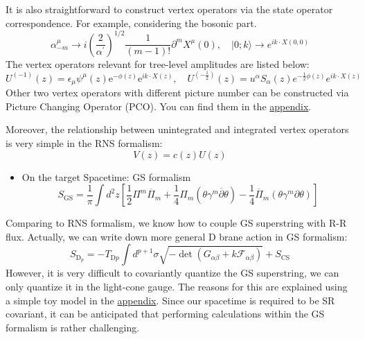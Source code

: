 \documentclass{beamer}
\begin{document}
	\begin{frame}
		It is also straightforward to construct vertex operators via the state operator correspondence. For example, considering the bosonic part.
		\begin{equation*}
			\alpha_{-m}^\mu\to i\left(\frac{2}{\alpha^{\prime}}\right)^{1/2}\frac{1}{(m-1)!}\partial^mX^\mu(0),\quad|0;k\rangle\to e^{ik\cdot X(0,0)}
		\end{equation*}
		The vertex operators relevant for tree-level amplitudes are listed below:
		\begin{equation*}
			U^{(-1)}(z)=\epsilon_\mu\psi^\mu(z)\mathrm{e}^{-\phi(z)}\mathrm{e}^{ik\cdot X(z)},\quad U^{(-\frac{1}{2})}(z)=u^\alpha S_\alpha(z)e^{-\frac{1}{2}\phi(z)}e^{ik\cdot X(z)}
		\end{equation*}
		Other two vertex operators with different picture number can be constructed via {\color{WHU}Picture Changing Operator (PCO)}. You can find them in the \hyperlink{vertex ops}{\color{blue} appendix}.
		
		Moreover, the relationship between unintegrated and integrated vertex operators is very simple in the RNS formalism:
		\begin{equation}\label{eq:UV}
			V(z) = c(z) U(z)
		\end{equation}
	\end{frame}
	\begin{frame}
		\begin{itemize}
		\item {\color{WHU} On the target Spacetime: GS formalism}
		\begin{equation*}
			S_{\mathrm{GS}}=\frac{1}{\pi}\int d^2z\left[\frac{1}{2}\Pi^m\overline{\Pi}_m+\frac{1}{4}\Pi_m(\theta\gamma^m\overline{\partial}\theta)-\frac{1}{4}\overline{\Pi}_m(\theta\gamma^m\partial\theta)\right]
		\end{equation*}
		\end{itemize}
		Comparing to RNS formalism, we know how to couple GS superstring with R-R flux. Actually, we can write down more general D brane action in GS formalism:
		\begin{equation*}
		S_{\text{D}_p}=-T_{\mathrm{D}p}\int d^{p+1}\sigma\sqrt{-\det(G_{\alpha\beta}+k\mathcal{F}_{\alpha\beta})}+S_{\text{CS}}
		\end{equation*}
		However, it is very difficult to covariantly quantize the GS superstring, we can {\color{WHU} only} quantize it in the light-cone gauge. The reasons for this are explained using a simple toy model in the \hyperlink{GS}{\color{blue}appendix}. Since our spacetime is required to be SR covariant, it can be anticipated that performing calculations within the GS formalism is rather challenging.
	\end{frame}
\end{document}
